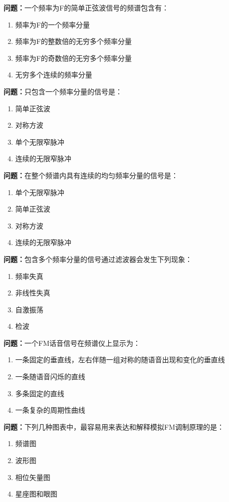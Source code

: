 \documentclass{ctexbook}
\begin{document}
\textbf{问题：}一个频率为F的简单正弦波信号的频谱包含有：
\begin{enumerate}[label=\Alph*), leftmargin=3em]
\item 频率为F的一个频率分量
\item 频率为F的整数倍的无穷多个频率分量
\item 频率为F的奇数倍的无穷多个频率分量
\item 无穷多个连续的频率分量
\end{enumerate}

\textbf{问题：}只包含一个频率分量的信号是：
\begin{enumerate}[label=\Alph*), leftmargin=3em]
\item 简单正弦波
\item 对称方波
\item 单个无限窄脉冲
\item 连续的无限窄脉冲
\end{enumerate}

\textbf{问题：}在整个频谱内具有连续的均匀频率分量的信号是：
\begin{enumerate}[label=\Alph*), leftmargin=3em]
\item 单个无限窄脉冲
\item 简单正弦波
\item 对称方波
\item 连续的无限窄脉冲
\end{enumerate}

\textbf{问题：}包含多个频率分量的信号通过滤波器会发生下列现象：
\begin{enumerate}[label=\Alph*), leftmargin=3em]
\item 频率失真
\item 非线性失真
\item 自激振荡
\item 检波
\end{enumerate}

\textbf{问题：}一个FM话音信号在频谱仪上显示为：
\begin{enumerate}[label=\Alph*), leftmargin=3em]
\item 一条固定的垂直线，左右伴随一组对称的随语音出现和变化的垂直线
\item 一条随语音闪烁的直线
\item 多条固定的直线
\item 一条复杂的周期性曲线
\end{enumerate}

\textbf{问题：}下列几种图表中，最容易用来表达和解释模拟FM调制原理的是：
\begin{enumerate}[label=\Alph*), leftmargin=3em]
\item 频谱图
\item 波形图
\item 相位矢量图
\item 星座图和眼图
\end{enumerate}
\end{document}
